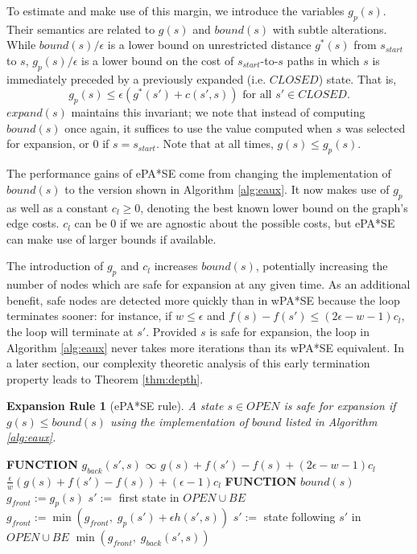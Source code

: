 \documentclass[letterpaper]{article}
\newtheorem{rul}{Expansion Rule}
\begin{document}
To estimate and make use of this margin, we introduce the variables $g_p(s)$. Their semantics are related to $g(s)$ and $bound(s)$ with subtle alterations. While $bound(s)/\epsilon$ is a lower bound on unrestricted distance $g^*(s)$ from $s_{start}$ to $s$, $g_p(s)/\epsilon$ is a lower bound on the cost of $s_{start}$-to-$s$ paths in which $s$ is immediately preceded by a previously expanded (i.e. $CLOSED$) state. That is,
\[g_p(s) \le \epsilon (g^*(s') + c(s',s))\text{ for all }s'\in CLOSED.\] $expand(s)$ maintains this invariant; we note that instead of computing $bound(s)$ once again, it suffices to use the value computed when $s$ was selected for expansion, or $0$ if $s=s_{start}$. Note that at all times, $g(s) \le g_p(s)$.

The performance gains of ePA*SE come from changing the implementation of $bound(s)$ to the version shown in Algorithm \ref{alg:eaux}. It now makes use of $g_p$ as well as a constant $c_l \ge 0$, denoting the best known lower bound on the graph's edge costs. $c_l$ can be 0 if we are agnostic about the possible costs, but ePA*SE can make use of larger bounds if available.

The introduction of $g_p$ and $c_l$ increases $bound(s)$, potentially increasing the number of nodes which are safe for expansion at any given time. As an additional benefit, safe nodes are detected more quickly than in wPA*SE because the loop terminates sooner: for instance, if $w \le \epsilon$ and $f(s) - f(s') \le (2\epsilon-w-1)c_l$, the loop will terminate at $s'$. Provided $s$ is safe for expansion, the loop in Algorithm \ref{alg:eaux} never takes more iterations than its wPA*SE equivalent. In a later section, our complexity theoretic analysis of this early termination property leads to Theorem \ref{thm:depth}.

\begin{rul}[ePA*SE rule]
A state $s\in OPEN$ is safe for expansion if $g(s) \le bound(s)$ using the implementation of $bound$ listed in Algorithm \ref{alg:eaux}.
\end{rul}

\begin{algorithm}
\caption{$bound(s)$ enhanced for ePA*SE}
\label{alg:eaux}
\begin{algorithmic}
\STATE \textbf{FUNCTION} $g_{back}(s',s)$
\RETURN $\infty$
\RETURN $g(s) + f(s') - f(s) + (2\epsilon-w-1)c_l$
\ELSE
\RETURN $\frac\epsilon w\left(g(s) + f(s') - f(s)\right) + (\epsilon-1)c_l$
\ENDIF
\STATE \textbf{FUNCTION} $bound(s)$
\STATE $g_{front} := g_p(s)$
\STATE $s' :=$ first state in $OPEN \cup BE$
\STATE $g_{front} := \min(g_{front},\;g_p(s') + \epsilon h(s',s))$
\STATE $s' :=$ state following $s'$ in $OPEN \cup BE$
\ENDWHILE
\RETURN $\min(g_{front},\;g_{back}(s',s))$
\end{algorithmic}
\end{algorithm}
\end{document}
